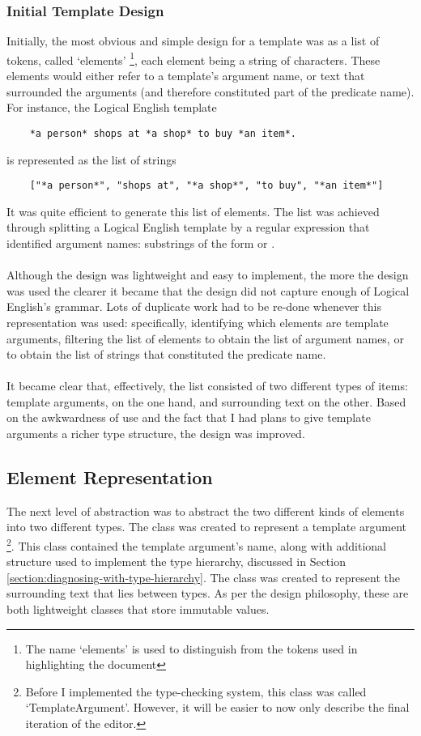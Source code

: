 \documentclass[../main.tex]{subfiles}
\begin{document}
\subsubsection{Initial Template Design}
Initially, the most obvious and simple design for a template was as a list of tokens, called `elements' \footnote{The name `elements' is used to distinguish from the tokens used in highlighting the document}, each element being a string of characters. These elements would either refer to a template's argument name, or text that surrounded the arguments (and therefore constituted part of the predicate name). For instance, the Logical English template
\begin{lstlisting}
    *a person* shops at *a shop* to buy *an item*.
\end{lstlisting}
is represented as the list of strings
\begin{lstlisting} 
    ["*a person*", "shops at", "*a shop*", "to buy", "*an item*"]
\end{lstlisting}
It was quite efficient to generate this list of elements. The list was achieved through splitting a Logical English template by a regular expression that identified argument names: substrings of the form  or . 
\\
\\
Although the design was lightweight and easy to implement, the more the design was used the clearer it became that the design did not capture enough of Logical English's grammar. Lots of duplicate work had to be re-done whenever this representation was used: specifically, identifying which elements are template arguments,  filtering the list of elements to obtain the list of argument names, or to obtain the list of strings that constituted the predicate name. 
\\ 
\\
It became clear that, effectively, the list consisted of two different types of items: template arguments, on the one hand, and surrounding text on the other. Based on the awkwardness of use and the fact that I had plans to give template arguments a richer type structure, the design was improved.

\subsection{Element Representation}
The next level of abstraction was to abstract the two different kinds of elements into two different types.
The class  was created to represent a template argument \footnote{Before I implemented the type-checking system, this class was called `TemplateArgument'. However, it will be easier to now only describe the final iteration of the editor.}. This  class contained the template argument's name, along with additional structure used to implement the type hierarchy, discussed in Section \ref{section:diagnosing-with-type-hierarchy}. The class  was created to represent the surrounding text that lies between types. As per the design philosophy, these are both lightweight classes that store immutable values.
\end{document}
